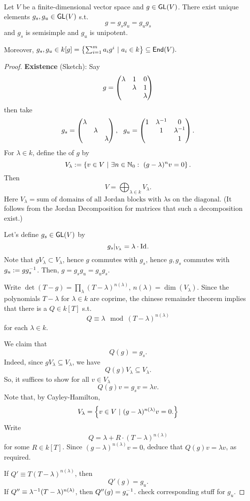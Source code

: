 \begin{proposition}
Let $V$ be a finite-dimensional vector space and $g \in \textsf{GL}(V)$. There exist unique elements $g_s, g_u \in \textsf{GL}(V)$ s.t.
\[ g = g_s g_u = g_u g_s \]
and $g_s$ is semisimple and $g_u$ is unipotent.

Moreover, $g_s, g_u \in k[g] = \left\lbrace\sum_{i=1}^m a_i g^i ~ | ~ a_i \in k\right\rbrace \subseteq \textsf{End}(V).$
\end{proposition}
\begin{proof}
\textbf{Existence} (Sketch): Say
\[ g = \left(\begin{matrix}  \lambda & 1 & 0\\ & \lambda & 1\\ & & \lambda \end{matrix}\right) \]
then take
\[ g_s = \left(\begin{matrix}  \lambda &  & \\ & \lambda & \\ & & \lambda \end{matrix}\right), ~~ g_u = \left(\begin{matrix}  1 & \lambda^{-1} & 0 \\ & 1 & \lambda^{-1} \\ & & 1 \end{matrix}\right). \]
For $\lambda \in k$, define the  of $g$ by
\[ V_\lambda := \left\lbrace v \in V ~ | ~ \exists n \in \mathbb{N}_0:~ (g-\lambda)^n v = 0  \right\rbrace. \]
Then
\[ V = \bigoplus_{\lambda \in k} V_\lambda. \]
Here $V_\lambda = \text{sum of domains of all Jordan blocks with }\lambda\text{s on the diagonal}.$ (It follows from the Jordan Decomposition for matrices that such a decomposition exist.)

Let's define $g_s \in \textsf{GL}(V)$ by
\[ g_s|_{V_\lambda} = \lambda \cdot \text{Id}_{}. \]
Note that $gV_\lambda \subset V_\lambda$, hence $g$ commutes with $g_s$, hence $g, g_s$ commutes with $g_u := gg_s^{-1}$. Then, $g = g_s g_u = g_ug_s$.


Write $\det(T- g) = \prod_\lambda (T-\lambda)^{n(\lambda)}$, $n(\lambda) = \dim (V_\lambda)$.
Since the polynomials $T-\lambda$ for $\lambda \in k$ are coprime, the chinese remainder theorem implies that there is a $Q \in k[T]$ s.t.
\[ Q \equiv  \lambda \mod (T-\lambda)^{n(\lambda)} \]
for each $\lambda \in k$.

We claim that
\[ Q(g) = g_s.  \]
Indeed, since $gV_\lambda \subseteq V_\lambda$, we have
\[ Q(g) V_\lambda \subseteq V_\lambda. \]
So, it suffices to show for all $v \in V_\lambda$
\[ Q(g)v =g_sv = \lambda v. \]
Note that, by Cayley-Hamilton,
\[ V_\lambda = \left\lbrace v \in V ~ | ~  (g-\lambda)^{n(\lambda)} v = 0. \right\rbrace \]
Write
\[ Q = \lambda + R \cdot (T-\lambda)^{n(\lambda)} \]
for some $R \in k[T]$.
Since $(g-\lambda)^{n(\lambda)}v = 0$, deduce that $Q(g)v = \lambda v$, as required.

If $Q' \equiv T(T-\lambda)^{n(\lambda)}$, then
\[ Q'(g) = g_u. \]
If $Q'' \equiv \lambda^{-1} (T- \lambda)^{n(\lambda)}$, then $Q''(g) = g^{-1}_s$.
check corresponding stuff for $g_u$.



\end{proof}
